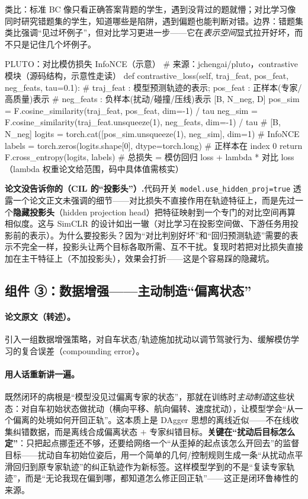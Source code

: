 类比：标准 BC 像只看正确答案背题的学生，遇到没背过的题就懵；对比学习像同时研究错题集的学生，知道哪些是陷阱，遇到偏题也能判断对错。边界：错题集类比强调“见过坏例子”，但对比学习更进一步——它在\emph{表示空间}显式拉开好坏，而不只是记住几个坏例子。

\begin{codebox}[Python]{PLUTO：对比模仿损失 InfoNCE（示意）}
# 来源：jchengai/pluto，contrastive 模块（源码结构，示意性走读）
def contrastive_loss(self, traj_feat, pos_feat, neg_feats, tau=0.1):
    # traj_feat : 模型预测轨迹的表示; pos_feat : 正样本(专家/高质量)表示
    # neg_feats : 负样本(扰动/碰撞/压线)表示 [B, N_neg, D]
    pos_sim = F.cosine_similarity(traj_feat, pos_feat, dim=-1) / tau
    neg_sim = F.cosine_similarity(traj_feat.unsqueeze(1), neg_feats, dim=-1) / tau  # [B, N_neg]
    logits = torch.cat([pos_sim.unsqueeze(1), neg_sim], dim=1)   # InfoNCE
    labels = torch.zeros(logits.shape[0], dtype=torch.long)      # 正样本在 index 0
    return F.cross_entropy(logits, labels)
# 总损失 = 模仿回归 loss + lambda * 对比 loss（lambda 权重论文给范围，码中具体值需核实）
\end{codebox}

\begin{note}
\textbf{论文没告诉你的（CIL 的“投影头”）.}\;代码开关 \texttt{model.use\_hidden\_proj=true} 透露一个论文正文未强调的细节——对比损失不直接作用在轨迹特征上，而是先过一个\textbf{隐藏投影头}（hidden projection head）把特征映射到一个专门的对比空间再算相似度。这与 SimCLR 的设计如出一辙（对比学习在投影空间做、下游任务用投影前的表示）。为什么要投影头？因为“对比判别好坏”和“回归预测轨迹”需要的表示不完全一样，投影头让两个目标各取所需、互不干扰。复现时若把对比损失直接加在主干特征上（不加投影头），效果会打折——这是个容易踩的隐藏坑。
\end{note}

\subsection{组件 ③：数据增强——主动制造“偏离状态”}
\label{sec:de-augment}

\paragraph{论文原文（转述）。}
引入一组数据增强策略，对自车状态/轨迹施加扰动以调节驾驶行为、缓解模仿学习的复合误差（compounding error）\cite{cheng2024pluto}。

\paragraph{用人话重新讲一遍。}
既然闭环的病根是“模型没见过偏离专家的状态”，那就在训练时\emph{主动制造}这些状态：对自车初始状态做扰动（横向平移、航向偏转、速度扰动），让模型学会“从一个偏离的处境如何开回正轨”。这本质上是 DAgger\cite{ross2011dagger} 思想的离线近似——不在线收集纠错数据，而是离线合成偏离状态 $+$ 专家纠错目标。\textbf{关键在“扰动后目标怎么定”}：只把起点挪歪还不够，还要给网络一个“从歪掉的起点该怎么开回去”的监督目标——扰动自车初始位姿后，用一个简单的几何/控制规则生成一条“从扰动点平滑回归到原专家轨迹”的纠正轨迹作为新标签。这样模型学到的不是“复读专家轨迹”，而是“无论我现在偏到哪，都知道怎么修正回正轨”——这正是闭环鲁棒性的来源。

